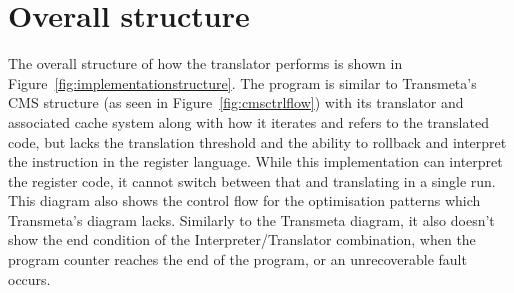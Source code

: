 \section{Overall structure}
The overall structure of how the translator performs is shown in
Figure~\ref{fig:implementationstructure}. The program is similar to Transmeta's
CMS structure (as seen in Figure~\ref{fig:cmsctrlflow}) with its translator and
associated cache system along with how it iterates and refers to the translated
code, but lacks the translation threshold and the ability to rollback and
interpret the instruction in the register language. While this implementation
can interpret the register code, it cannot switch between that and translating
in a single run. This diagram also shows the control flow for the optimisation
patterns which Transmeta's diagram lacks. Similarly to the Transmeta diagram, it
also doesn't show the end condition of the Interpreter/Translator combination,
when the program counter reaches the end of the program, or an unrecoverable
fault occurs.

